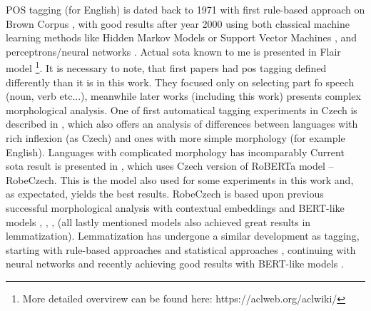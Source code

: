 POS tagging (for English) is dated back to 1971 with first rule-based approach on Brown Corpus \citep{greene1971automatic}, with good results after year 2000 using both classical machine learning methods like Hidden Markov Models \citep{tnt} or Support Vector Machines \citep{svmtool}, and perceptrons/neural networks  \citep{collins-2002-discriminative}. Actual \acrlong{sota} known to me is presented in Flair model \citep{Akbik2018}\footnote{More detailed overvirew can be found here: https://aclweb.org/aclwiki/}. It is necessary to note, that first papers had \acrshort{pos} tagging defined differently than it is in this work. They focused only on selecting part fo speech (noun, verb etc...), meanwhile later works (including this work) presents  complex morphological analysis. %
One of first automatical tagging experiments in Czech is described in \citep{Hladka}, which also offers an analysis of differences between languages with rich inflexion (as Czech) and ones with more simple morphology (for example English). Languages with complicated morphology has incomparably   Current \acrshort{sota} result is presented in \citep{Straka2021}, which uses Czech version of RoBERTa model -- RobeCzech. This is the model also used for some experiments in this work and, as expectated,  yields the best results. RobeCzech is based upon previous successful morphological analysis with contextual embeddings and BERT-like models \citep{Straka2019b}, \citep{Straka2019a}, \citep{Straka2019}, \citep{Straka2018} (all lastly mentioned models also achieved great results in lemmatization). %
Lemmatization has undergone a similar development as tagging, starting with rule-based approaches and statistical approaches \citep{Plisson}, continuing with neural networks and recently achieving good results with BERT-like models \citep{Kondratyuk2019}.







